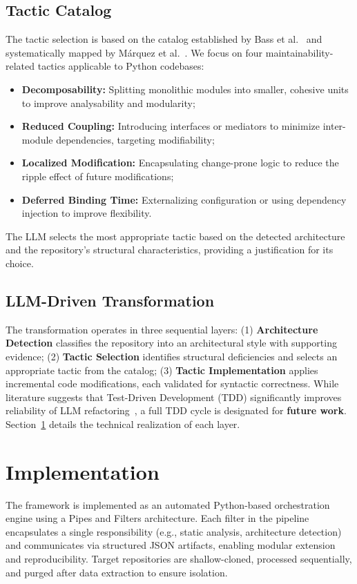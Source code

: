 \documentclass[sigconf,review,anonymous]{acmart}
\begin{document}
\subsection{Tactic Catalog}
The tactic selection is based on the catalog established by Bass et al.~\cite{bass2021software} and systematically mapped by M\'arquez et al.~\cite{marquez2022architectural}. We focus on four maintainability-related tactics applicable to Python codebases:
\begin{itemize}[nosep]
    \item \textbf{Decomposability:} Splitting monolithic modules into smaller, cohesive units to improve analysability and modularity;
    \item \textbf{Reduced Coupling:} Introducing interfaces or mediators to minimize inter-module dependencies, targeting modifiability;
    \item \textbf{Localized Modification:} Encapsulating change-prone logic to reduce the ripple effect of future modifications;
    \item \textbf{Deferred Binding Time:} Externalizing configuration or using dependency injection to improve flexibility.
\end{itemize}
The LLM selects the most appropriate tactic based on the detected architecture and the repository's structural characteristics, providing a justification for its choice.

\subsection{LLM-Driven Transformation}
The transformation operates in three sequential layers: (1) \textbf{Architecture Detection} classifies the repository into an architectural style with supporting evidence; (2) \textbf{Tactic Selection} identifies structural deficiencies and selects an appropriate tactic from the catalog; (3) \textbf{Tactic Implementation} applies incremental code modifications, each validated for syntactic correctness. While literature suggests that Test-Driven Development (TDD) significantly improves reliability of LLM refactoring~\cite{xu2025mantra, piao2025refactoring}, a full TDD cycle is designated for \textbf{future work}. Section~\ref{sec:implementation} details the technical realization of each layer.

\section{Implementation}\label{sec:implementation}
The framework is implemented as an automated Python-based orchestration engine using a Pipes and Filters architecture. Each filter in the pipeline encapsulates a single responsibility (e.g., static analysis, architecture detection) and communicates via structured JSON artifacts, enabling modular extension and reproducibility. Target repositories are shallow-cloned, processed sequentially, and purged after data extraction to ensure isolation.
\end{document}
